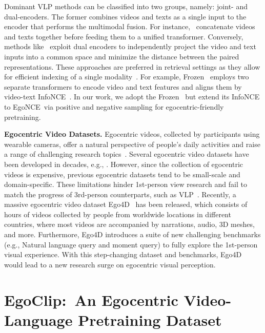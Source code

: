 \documentclass{article}
\newcommand{\dataset}{EgoClip}
\newcommand{\model}{EgoNCE\xspace}
\begin{document}
Dominant VLP methods can be classified into two groups, namely: joint- and dual-encoders. The former combines videos and texts as a single input to the encoder that performs the multimodal fusion. For instance,~\cite{lei2021less,Sun_2019_ICCV} concatenate videos and texts together before feeding them to a unified transformer.
Conversely, methods like~\cite{bain2021frozen,wang2022object} exploit dual encoders to independently project the video and text inputs into a common space and minimize the distance between the paired representations. 
These approaches are preferred in retrieval settings as they allow for efficient indexing of a single modality~\cite{escorcia2019temporal,miech2021thinking}.
For example, Frozen~\cite{bain2021frozen} employs two separate transformers to encode video and text features and aligns them by video-text InfoNCE~\cite{infonce}.
In our work, we adopt the Frozen~\cite{bain2021frozen} but extend its InfoNCE to \model~via positive and negative sampling for egocentric-friendly pretraining.

\noindent\textbf{Egocentric Video Datasets.}
Egocentric videos, collected by participants using wearable cameras, offer a natural perspective of people's daily activities and raise a range of challenging research topics~\cite{caba2015activitynet, abu2018will, wong2022assistq}.
Several egocentric video datasets have been developed in decades, e.g., \cite{damen2022rescaling, sigurdsson2018charades, li2015delving}.
However, since the collection of egocentric videos is expensive, previous egocentric datasets tend to be small-scale and domain-specific.
These limitations hinder 1st-person view research and fail to match the progress of 3rd-person counterparts, such as VLP~\cite{miech2020end,lei2021less,bain2021frozen}.
Recently, a massive egocentric video dataset Ego4D~\cite{grauman2021ego4d} has been released, which consists of  hours of videos collected by  people from  worldwide locations in  different countries, where most videos are accompanied by narrations, audio, 3D meshes, and more.
Furthermore, Ego4D introduces a suite of new challenging benchmarks (e.g., Natural language query and moment query) to fully explore the 1st-person visual experience.
With this step-changing dataset and benchmarks, Ego4D would lead to a new research surge on egocentric visual perception. \section{\dataset:~An Egocentric Video-Language Pretraining Dataset}
\end{document}
